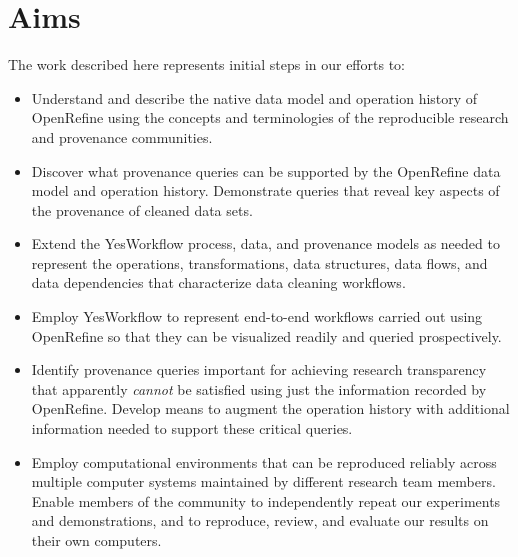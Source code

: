 \section{Aims}

The work described here represents initial steps in our efforts to:

\begin{itemize}[label=\raisebox{0.25ex}{\tiny$\bullet$}]

\item Understand and describe the native data model and operation history of OpenRefine using the concepts and terminologies of the reproducible research and provenance communities.

\item Discover what provenance queries can be supported by the OpenRefine data model and operation history.  Demonstrate queries that reveal key aspects of the provenance of cleaned data sets.

\item Extend the YesWorkflow \cite{mcphillips2015yesworkflowa} process, data, and provenance models as needed to represent the operations, transformations, data structures, data flows, and data dependencies that characterize data cleaning workflows.  

\item Employ YesWorkflow to represent end-to-end workflows carried out using OpenRefine so that they can be visualized readily and queried prospectively.

\item Identify provenance queries important for achieving research transparency that apparently \emph{cannot} be satisfied using just the information recorded by OpenRefine. Develop means to augment the operation history with additional information needed to support these critical queries.

\item Employ computational environments that can be reproduced reliably across multiple computer systems maintained by different research team members. Enable members of the community to independently repeat our experiments and demonstrations, and to reproduce, review, and evaluate our results on their own computers.

\end{itemize}
